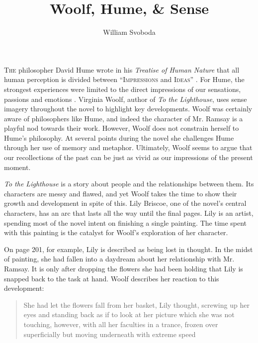 %
%



\titlehead{Princeton University}
\title{Woolf, Hume, \& Sense}
\author{William Svoboda}
\subject{Ways of Knowing: Philosophy and Literature}
\date{}

%
%



\maketitle

\lettrine[lines=3, nindent=0pt, findent=0.25em, loversize=0.09]{T}{he} philosopher David Hume wrote in his \emph{Treatise of Human Nature} that all human perception is divided between \enquote{\textsc{Impressions} and \textsc{Ideas}} \autocite[1]{hume_78}. For Hume, the strongest experiences were limited to the direct impressions of our sensations, passions and emotions \autocite[1]{hume_78}. Virginia Woolf, author of \emph{To the Lighthouse}, uses sense imagery throughout the novel to highlight key developments. Woolf was certainly aware of philosophers like Hume, and indeed the character of Mr. Ramsay is a playful nod towards their work. However, Woolf does not constrain herself to Hume's philosophy. At several points during the novel she challenges Hume through her use of memory and metaphor. Ultimately, Woolf seems to argue that our recollections of the past can be just as vivid as our impressions of the present moment.

\emph{To the Lighthouse} is a story about people and the relationships between them. Its characters are messy and flawed, and yet Woolf takes the time to show their growth and development in spite of this. Lily Briscoe, one of the novel's central characters, has an arc that lasts all the way until the final pages. Lily is an artist, spending most of the novel intent on finishing a single painting. The time spent with this painting is the catalyst for Woolf's exploration of her character.

On page 201, for example, Lily is described as being lost in thought. In the midst of painting, she had fallen into a daydream about her relationship with Mr. Ramsay. It is only after dropping the flowers she had been holding that Lily is snapped back to the task at hand. Woolf describes her reaction to this development:

\blockcquote[][201]{woolf_81}[.]{She had let the flowers fall from her basket, Lily thought, screwing up her eyes and standing back as if to look at her picture which she was not touching, however, with all her faculties in a trance, frozen over superficially but moving underneath with extreme speed}

